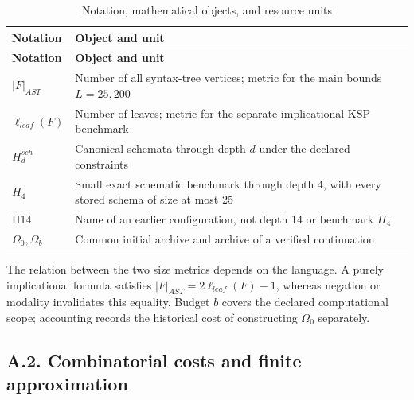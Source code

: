 \documentclass[pdflatex,sn-basic,Numbered]{sn-jnl}
\begin{document}
\begin{longtable}[]{@{}
  >{\raggedright\arraybackslash}p{}
  >{\raggedright\arraybackslash}p{}@{}}
\caption{Notation, mathematical objects, and resource units}\label{tab:8}\tabularnewline
\toprule\noalign{}
\begin{minipage}[b]{\linewidth}\raggedright
\textbf{Notation}
\end{minipage} & \begin{minipage}[b]{\linewidth}\raggedright
\textbf{Object and unit}
\end{minipage} \\
\midrule\noalign{}
\endfirsthead
\toprule\noalign{}
\begin{minipage}[b]{\linewidth}\raggedright
\textbf{Notation}
\end{minipage} & \begin{minipage}[b]{\linewidth}\raggedright
\textbf{Object and unit}
\end{minipage} \\
\midrule\noalign{}
\endhead
\bottomrule\noalign{}
\endlastfoot
\(|F|_{AST}\) & Number of all syntax-tree vertices; metric for the main bounds \(L = 25,200\) \\
\(\ell_{leaf}(F)\) & Number of leaves; metric for the separate implicational KSP benchmark \\
\(H_{d}^{sch}\) & Canonical schemata through depth \(d\) under the declared constraints \\
\(H_{4}\) & Small exact schematic benchmark through depth 4, with every stored schema of size at most 25 \\
H14 & Name of an earlier configuration, not depth 14 or benchmark \(H_{4}\) \\
\(\Omega_{0},\Omega_{b}\) & Common initial archive and archive of a verified continuation \\
\end{longtable}

\endgroup

The relation between the two size metrics depends on the language. A purely implicational formula satisfies \(|F|_{AST} = 2\ell_{leaf}(F) - 1\), whereas negation or modality invalidates this equality. Budget \(b\) covers the declared computational scope; accounting records the historical cost of constructing \(\Omega_{0}\) separately.

\subsection*{A.2. Combinatorial costs and finite approximation}\label{a.2.-combinatorial-costs-and-finite-approximation}
\end{document}
